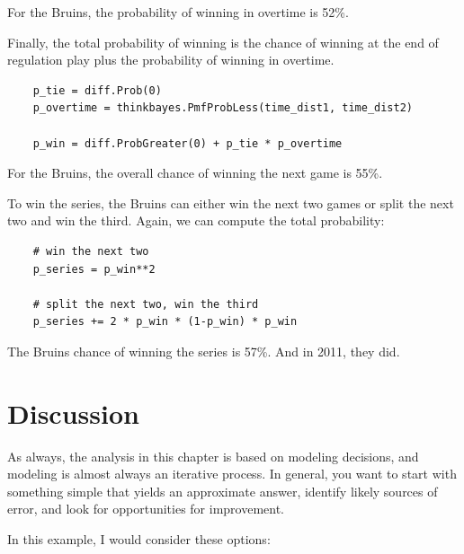 \documentclass[12pt]{book}
\begin{document}
For the Bruins, the probability of winning in overtime is 52\%.

Finally, the total probability of winning is the chance of
winning at the end of regulation play plus the probability
of winning in overtime.

\begin{verbatim}
    p_tie = diff.Prob(0)
    p_overtime = thinkbayes.PmfProbLess(time_dist1, time_dist2)

    p_win = diff.ProbGreater(0) + p_tie * p_overtime
\end{verbatim}  

For the Bruins, the overall chance of winning the next game is 55\%.

To win the series, the Bruins can either win the next two games
or split the next two and win the third.  Again, we can compute
the total probability:

\begin{verbatim}
    # win the next two
    p_series = p_win**2

    # split the next two, win the third
    p_series += 2 * p_win * (1-p_win) * p_win
\end{verbatim}  

The Bruins chance of winning the series is 57\%.  And in 2011,
they did.


\section{Discussion}

As always, the analysis in this chapter is based on modeling decisions,
and modeling is almost always an iterative process.  In general,
you want to start with something simple that yields an approximate
answer, identify likely sources of error, and look for opportunities
for improvement.

In this example, I would consider these options:
\end{document}
